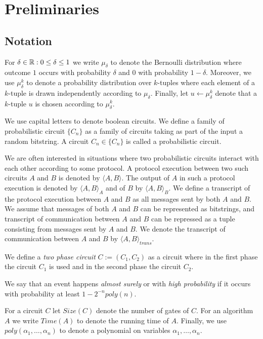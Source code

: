 \chapter{Preliminaries}
\section{Notation}
For $\delta \in \mathbb{R} : 0 \leq \delta \leq 1$ we write $\mu_{\delta}$ to denote the Bernoulli distribution where outcome $1$ occurs with
probability $\delta$ and $0$ with probability $1-\delta$.
Moreover, we use $\mu_{\delta}^k$ to denote a probability distribution over $k$-tuples
where each element of a $k$-tuple is drawn independently according to $\mu_{\delta}$.
Finally, let $u \leftarrow \mu_{\delta}^k$ denote that a $k$-tuple $u$ is chosen according to $\mu_{\delta}^k$.

We use capital letters to denote boolean circuits. We define a family of probabilistic circuit $\{C_n\}$
as a family of circuits taking as part of the input a random bitstring.
A circuit $C_n \in \{C_n\}$ is called a probabilistic circuit.

We are often interested in situations where two probabilistic circuits interact with each other according to some protocol.
A protocol execution between two such circuits $A$ and $B$ is denoted by $\langle A, B \rangle$.
The output of $A$ in such a protocol execution is denoted by $\langle A, B \rangle_A$ and of $B$ by $\langle A, B \rangle_B$.
We define a transcript of the protocol execution between $A$ and $B$ as all messages sent by both $A$ and $B$.
We assume that messages of both $A$ and $B$ can be represented as bitstrings, and transcript of communication between $A$ and $B$
can be repressed as a tuple consisting from messages sent by $A$ and $B$.
We denote the transcript of communication between $A$ and $B$ by $\langle A, B \rangle_{\mathit{trans}}$.

We define a \textit{two phase circuit} $C := (C_1, C_2)$ as a circuit where in the first phase the circuit $C_1$
is used and in the second phase the circuit $C_2$.

We say that an event happens \textit{almost surely} or with \textit{high probability} if
it occurs with probability at least $1 - 2^{-n} \mathit{poly}(n)$.

For a circuit $C$ let $\mathit{Size}(C)$ denote the number of gates of $C$. For an algorithm $A$ we write $\mathit{Time}(A)$ to denote the running time of $A$.
Finally, we use $\mathit{poly}(\alpha_1, \dots, \alpha_n)$ to denote a polynomial on variables $\alpha_1, \dots, \alpha_n$.

